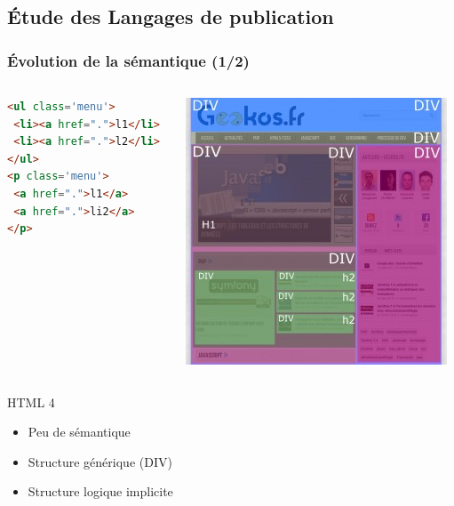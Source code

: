 \documentclass[]{beamer}
\begin{document}
\subsection{Étude des Langages de publication}
\begin{frame}[fragile]
\frametitle{Évolution de la sémantique (1/2)}
\begin{columns}
	\begin{column}{5cm}
\begin{lstlisting}[frame=single, language=html]
<ul class='menu'>
 <li><a href=".">l1</li>
 <li><a href=".">l2</li>
</ul>
<p class='menu'>
 <a href=".">l1</a>
 <a href=".">li2</a>
</p>
\end{lstlisting}
	\end{column}
	\begin{column}{5cm}
	\includegraphics[scale=0.4]{img/architecture_HTML4.jpg}	
	\end{column}
\end{columns}
	\begin{block}{HTML 4}
	\begin{itemize}
		\item Peu de sémantique
		\item Structure générique (DIV)
		\item Structure logique implicite
	\end{itemize}
	\end{block}
\end{frame}
\end{document}
